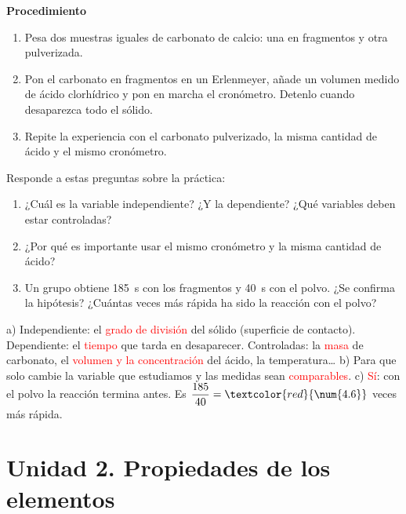 \medskip

\textbf{Procedimiento}
\begin{enumerate}[label=\numberballgreen]
    \item Pesa dos muestras iguales de carbonato de calcio: una en fragmentos y otra pulverizada.
    \item Pon el carbonato en fragmentos en un Erlenmeyer, añade un volumen medido de ácido clorhídrico y pon en marcha el cronómetro. Detenlo cuando desaparezca todo el sólido.
    \item Repite la experiencia con el carbonato pulverizado, la misma cantidad de ácido y el mismo cronómetro.
\end{enumerate}

\begin{exercise}
    Responde a estas preguntas sobre la práctica:
    \begin{enumerate}[label=\alph*)]
        \item ¿Cuál es la variable independiente? ¿Y la dependiente? ¿Qué variables deben estar controladas?
        \item ¿Por qué es importante usar el mismo cronómetro y la misma cantidad de ácido?
        \item Un grupo obtiene \qty{185}{\s} con los fragmentos y \qty{40}{\s} con el polvo. ¿Se confirma la hipótesis? ¿Cuántas veces más rápida ha sido la reacción con el polvo?
    \end{enumerate}
    \begin{solu}
        a) Independiente: el \textcolor{red}{grado de división} del sólido (superficie de contacto). Dependiente: el \textcolor{red}{tiempo} que tarda en desaparecer. Controladas: la \textcolor{red}{masa} de carbonato, el \textcolor{red}{volumen y la concentración} del ácido, la temperatura\ldots
        b) Para que solo cambie la variable que estudiamos y las medidas sean \textcolor{red}{comparables}.
        c) \textcolor{red}{Sí}: con el polvo la reacción termina antes. Es \(\dfrac{185}{40} = \textcolor{red}{\num{4.6}}\) veces más rápida.
    \end{solu}
\end{exercise}

\section{Unidad 2. Propiedades de los elementos}

